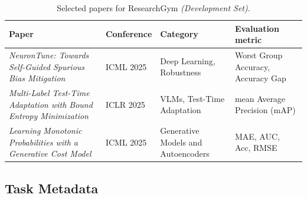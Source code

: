 \documentclass[11pt]{article}
\let\cite\citep
\theoremstyle{plain}
\theoremstyle{definition}
\theoremstyle{remark}
\begin{document}
\begin{table}[ht]
\centering
\small
\renewcommand{\arraystretch}{1.44} %

{ %
\begin{tabularx}{\textwidth}{@{}%
  >{\raggedright\arraybackslash}X%
  >{\raggedright\arraybackslash}p{1.6cm}%
  >{\raggedright\arraybackslash}p{2.9cm}%
  >{\raggedright\arraybackslash}p{3.1cm}@{}}
\toprule
\rowcolor{white}\textbf{Paper} & \textbf{Conference} & \textbf{Category} & \textbf{Evaluation metric} \\
\midrule
\emph{NeuronTune: Towards Self-Guided Spurious Bias Mitigation \cite{zheng2025neurontune}} & ICML 2025 & Deep Learning, Robustness & Worst Group Accuracy, Accuracy Gap \\
\emph{Multi-Label Test-Time Adaptation with Bound Entropy Minimization \cite{wu2025multilabel}} & ICLR 2025 & VLMs, Test-Time Adaptation & mean Average Precision (mAP) \\
\emph{Learning Monotonic Probabilities with a Generative Cost Model \cite{tang2025learning}} & ICML 2025 & Generative Models and Autoencoders & MAE, AUC, Acc, RMSE \\
\bottomrule
\end{tabularx}
}
\caption{Selected papers for ResearchGym \emph{(Development Set)}.}
\label{tab:dev-tasks}
\end{table}

\subsection{Task Metadata} \label{app:task-metadata}
\end{document}
